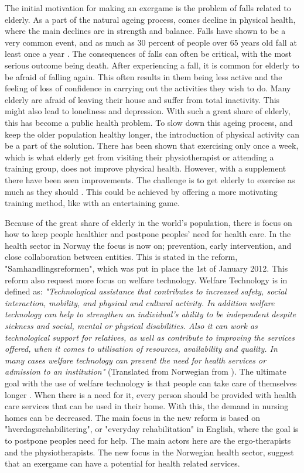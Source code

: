 The initial motivation for making an exergame is the problem of falls related to elderly. As a part of the natural ageing process, comes decline in physical health, where the main declines are in strength and balance. Falls have shown to be a very common event, and as much as 30 percent of people over 65 years old fall at least once a year \cite{otago}. The consequences of falls can often be critical, with the most serious outcome being death. After experiencing a fall, it is common for elderly to be afraid of falling again. This often results in them being less active and the feeling of loss of confidence in carrying out the activities they wish to do. Many elderly are afraid of leaving their house and suffer from total inactivity. This might also lead to loneliness and depression. With such a great share of elderly, this has become a public health problem. To slow down this ageing process, and keep the older population healthy longer, the introduction of physical activity can be a part of the solution. There has been shown that exercising only once a week, which is what elderly get from visiting their physiotherapist or attending a training group, does not improve physical health. However, with a supplement there have been seen improvements. The challenge is to get elderly to exercise as much as they should \cite{statistikknorge12}. This could be achieved by offering a more motivating training method, like with an entertaining game.

Because of the great share of elderly in the world's population, there is focus on how to keep people healthier and postpone peoples' need for health care.  In the health sector in Norway the focus is now on; prevention, early intervention, and close collaboration between entities. This is stated in the reform, "Samhandlingsreformen", which was put in place the 1st of January 2012. This reform also request more focus on welfare technology. Welfare Technology is in \cite{welfare} defined as: \emph{"Technological assistance that contributes to increased safety, social interaction, mobility, and physical and cultural activity. In addition welfare technology can help to strengthen an individual's ability to be independent despite sickness and social, mental or physical disabilities. Also it can work as technological support for relatives, as well as contribute to improving the services offered, when it comes to utilisation of resources, availability and quality. In many cases welfare technology can prevent the need for health services or admission to an institution"} (Translated from Norwegian from \cite{welfare}). The ultimate goal with the use of welfare technology is that people can take care of themselves longer \cite{regjering}. When there is a need for it, every person should be provided with health care services that can be used in their home. With this, the demand in nursing homes can be decreased. The main focus in the new reform is based on "hverdagsrehabilitering", or "everyday rehabilitation" in English, where the goal is to postpone peoples need for help. The main actors here are the ergo-therapists and the physiotherapists. The new focus in the Norwegian health sector, suggest that an exergame can have a potential for health related services.

